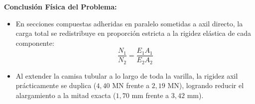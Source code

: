 \begin{table}[H]
    \centering
    \caption{Comparación de rigidez y alargamiento de la varilla en función del encamisado ($P = 15\text{ kN}$, $L = 0{,}5\text{ m}$).}
    \vspace{2mm}
    \label{tab:resumen_varilla_camisa}
\end{table}

\begin{tcolorbox}[colback=myg!10!white, colframe=myg!70!black, arc=4pt, boxrule=0.9pt]
    \textbf{Conclusión Física del Problema:}
    \begin{itemize}
        \item En secciones compuestas adheridas en paralelo sometidas a axil directo, la carga total se redistribuye en proporción estricta a la rigidez elástica de cada componente:
        $$\frac{N_1}{N_2} = \frac{E_1 A_1}{E_2 A_2}$$
        \item Al extender la camisa tubular a lo largo de toda la varilla, la rigidez axil prácticamente se duplica ($4{,}40\text{ MN}$ frente a $2{,}19\text{ MN}$), logrando reducir el alargamiento a la mitad exacta ($1{,}70\text{ mm}$ frente a $3{,}42\text{ mm}$).
    \end{itemize}
\end{tcolorbox}

